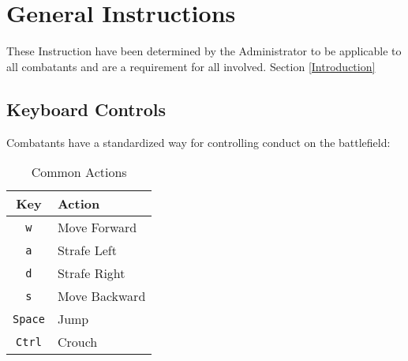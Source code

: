 \documentclass[12pt]{article}
\begin{document}
\newpage
\section{General Instructions}
\label{general_instructions}

These Instruction have been determined by the Administrator to be applicable to all combatants and are a requirement for all involved. Section \ref{Introduction}

  \subsection{Keyboard Controls}
  Combatants have a standardized way for controlling conduct on the battlefield:

\begin{table}[h!b!p!]
\caption{Common Actions}
\begin{tabular}{|c|l|}
  \hline
  Key & Action\\
  \hline
  \texttt{w}&Move Forward\\
  \texttt{a}&Strafe Left\\
  \texttt{d}&Strafe Right\\
  \texttt{s}&Move Backward\\
  \texttt{Space}&Jump\\
  \texttt{Ctrl}&Crouch\\
  \hline
\end{tabular}
\label{table_common_actions}
\end{table}
\end{document}
